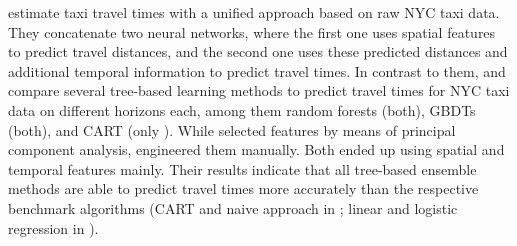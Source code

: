 \cite{jindal2017unified} estimate taxi travel times with a unified approach based on raw NYC taxi data. They concatenate two neural networks, where the first one uses spatial features to predict travel distances, and the second one uses these predicted distances and additional temporal information to predict travel times. 
In contrast to them, \cite{Huang2018_GBDT} and \cite{huang2020travel_GBDT} compare several tree-based learning methods to predict travel times for NYC taxi data on different horizons each, among them random forests (both), GBDTs (both), and CART (only \cite{huang2020travel_GBDT}). While \cite{Huang2018_GBDT} selected features by means of principal component analysis, \cite{huang2020travel_GBDT} engineered them manually. Both ended up using spatial and temporal features mainly. Their results indicate that all tree-based ensemble methods are able to predict travel times more accurately than the respective benchmark algorithms (CART and naive approach in \cite{huang2020travel_GBDT}; linear and logistic regression in \cite{Huang2018_GBDT}).



